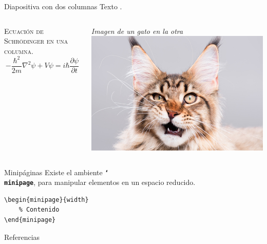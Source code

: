 \documentclass{beamer}
\newcommand{\bftt}[1]{\textbf{\texttt{#1}}}
\newcommand{\cmd}[1]{{\color{mygreen}\bftt{#1}}}
\newcommand{\bs}{\char`\\}
\newcommand{\cmdbs}[1]{\cmd{\bs#1}}
\begin{document}
    \begin{frame}{Diapositiva con dos columnas}
        Texto \cite{einstein}.
        \begin{columns}[totalwidth=\textwidth]
            \begin{column}[t]{0.5\textwidth}
            \centering
            \textsc{Ecuación de Schrödinger en una columna}.
            \vspace{0.5cm}
            \begin{equation*}
                -\frac{\hbar^2}{2m}\nabla^2\psi + V\psi =  i\hbar\frac{\partial \psi}{\partial t}
            \end{equation*}
            \end{column}
            \vrule{}
            \begin{column}[t]{0.5\textwidth}
                \centering
                \emph{\textrm{Imagen de un gato en la otra}}\\ [2ex]
                \centering
                \includegraphics[width=0.8\linewidth]{gato.jpeg}
            \end{column}
        \end{columns}        
    \end{frame}

    \begin{frame}[fragile]{Minipáginas}
        Existe el ambiente \cmdbs{minipage}, para manipular
        elementos en un espacio reducido. \\ [3ex]
        \begin{center}
            \begin{minipage}{0.45\textwidth}        
                \begin{verbatim}
\begin{minipage}{width}
    % Contenido
\end{minipage}
                \end{verbatim}
            \end{minipage}
        \end{center}
    \end{frame}

    \begin{frame}{Referencias}
        \printbibliography
    \end{frame}
\end{document}
